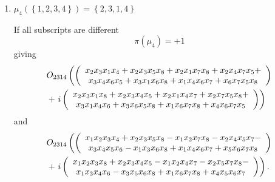 \documentclass[aps,preprint]{revtex4}%
\newtheorem{remark}[theorem]{Remark}
\begin{document}
\begin{enumerate}
\begin{remark}
\begin{align*}
\begin{array}
[c]{c}%
\overset{}{x_{1}x_{2}x_{3}x_{4}+}\\
x_{1}x_{4}x_{6}x_{7}-x_{1}x_{2}x_{7}x_{8}-x_{1}x_{3}x_{6}x_{8}-x_{3}x_{4}%
x_{5}x_{6}-x_{2}x_{4}x_{5}x_{7}+x_{2}x_{3}x_{5}x_{8}+\\
x_{5}x_{6}x_{7}x_{8}%
\end{array}
\right)  \right. \\
&  +\left.  i\left(
\begin{array}
[c]{c}%
-\overset{}{x_{1}x_{2}x_{4}x_{7}-x_{1}x_{3}x_{4}x_{6}+x_{1}x_{2}x_{3}%
x_{8}+x_{1}x_{6}x_{7}x_{8}}+\\
-x_{3}x_{4}x_{5}x_{6}+x_{4}x_{5}x_{6}x_{7}-x_{2}x_{5}x_{7}x_{8}-x_{3}%
x_{5}x_{6}x_{8}%
\end{array}
\right)  \right)  .
\end{align*}

\end{remark}

\item $\mu_{4}\left(  \left\{  1,2,3,4\right\}  \right)  =\left\{
2,3,1,4\right\}  $

If all subscripts are different
\begin{equation}
\pi\left(  \mu_{4}\right)  =+1
\end{equation}
giving%
\begin{align*}
&  O_{2314}\left(  \left(
\begin{array}
[c]{c}%
\overset{}{x_{2}x_{3}x_{1}x_{4}+x_{2}x_{3}x_{5}x_{8}+x_{2}x_{1}x_{7}%
x_{8}+x_{2}x_{4}x_{7}x_{5}}+\\
x_{3}x_{4}x_{6}x_{5}+x_{3}x_{1}x_{6}x_{8}+x_{1}x_{4}x_{6}x_{7}+x_{6}x_{7}%
x_{5}x_{8}%
\end{array}
\right)  \right. \\
&  +\left.  i\left(
\begin{array}
[c]{c}%
\overset{}{x_{2}x_{3}x_{1}x_{8}+x_{2}x_{3}x_{4}x_{5}+x_{2}x_{1}x_{4}%
x_{7}+x_{2}x_{7}x_{5}x_{8}}+\\
x_{3}x_{1}x_{4}x_{6}+x_{3}x_{6}x_{5}x_{8}+x_{1}x_{6}x_{7}x_{8}+x_{4}x_{6}%
x_{7}x_{5}%
\end{array}
\right)  \right)
\end{align*}
and
\begin{align*}
&  O_{2314}\left(  \left(
\begin{array}
[c]{c}%
\overset{}{x_{1}x_{2}x_{3}x_{4}+x_{2}x_{3}x_{5}x_{8}-x_{1}x_{2}x_{7}%
x_{8}-x_{2}x_{4}x_{5}x_{7}}-\\
x_{3}x_{4}x_{5}x_{6}-x_{1}x_{3}x_{6}x_{8}+x_{1}x_{4}x_{6}x_{7}+x_{5}x_{6}%
x_{7}x_{8}%
\end{array}
\right)  \right. \\
&  +\left.  i\left(
\begin{array}
[c]{c}%
\overset{}{x_{1}x_{2}x_{3}x_{8}+x_{2}x_{3}x_{4}x_{5}-x_{1}x_{2}x_{4}%
x_{7}-x_{2}x_{5}x_{7}x_{8}}-\\
x_{1}x_{3}x_{4}x_{6}-x_{3}x_{5}x_{6}x_{8}+x_{1}x_{6}x_{7}x_{8}+x_{4}x_{5}%
x_{6}x_{7}%
\end{array}
\right)  \right)  .
\end{align*}



\end{enumerate}
\end{document}

